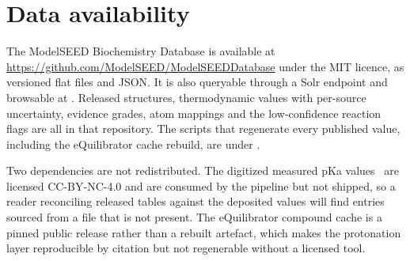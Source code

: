 \section{Data availability}

The ModelSEED Biochemistry Database is available at
\url{https://github.com/ModelSEED/ModelSEEDDatabase} under the MIT licence, as
versioned flat files and JSON. It is also queryable through a Solr endpoint and
browsable at \modelseedurl. Released structures, thermodynamic values with per-source uncertainty,
evidence grades, atom mappings and the low-confidence reaction flags are all in
that repository. The scripts that regenerate every published value, including
the eQuilibrator cache rebuild, are under .

Two dependencies are not redistributed. The digitized measured pKa
values~\cite{iupac_pka} are licensed CC-BY-NC-4.0 and are consumed by the
pipeline but not shipped, so a reader reconciling released tables against the
deposited values will find entries sourced from a file that is not present. The
eQuilibrator compound cache is a pinned public release rather than a rebuilt
artefact, which makes the protonation layer reproducible by citation but not
regenerable without a licensed tool.
